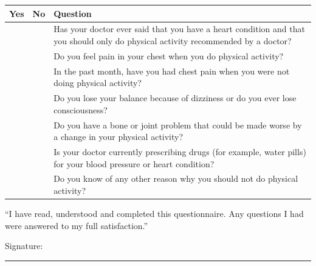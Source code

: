 \documentclass[index]{subfiles}
\begin{document}
\begin{table}[H]
    \centering
    \begin{tabular}{@{}c|c|p{12cm}@{}} \toprule
        {Yes} & {No} & {Question}                                                                                                                       \\ \midrule
              &      & Has your doctor ever said that you have a heart condition and that you should only do physical activity recommended by a doctor? \\ \hline
              &      & Do you feel pain in your chest when you do physical activity?                                                                    \\ \hline
              &      & In the past month, have you had chest pain when you were not doing physical activity?                                            \\ \hline
              &      & Do you lose your balance because of dizziness or do you ever lose consciousness?                                                 \\ \hline
              &      & Do you have a bone or joint problem that could be made worse by a change in your physical activity?                              \\ \hline
              &      & Is your doctor currently prescribing drugs (for example, water pills) for your blood pressure or heart condition?                \\ \hline
              &      & Do you know of any other reason why you should not do physical activity?
    \end{tabular}
\end{table}

``I have read, understood and completed this questionnaire. Any questions I had were answered to my full satisfaction.''

Signature:
\noindent\rule{0.8\textwidth}{1pt}
\end{document}
